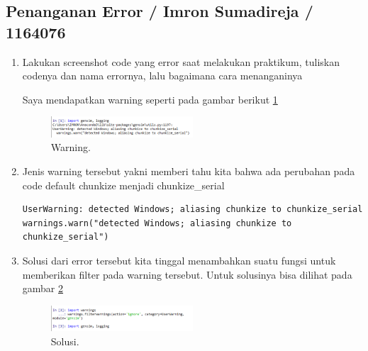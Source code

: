 \subsection{Penanganan Error / Imron Sumadireja / 1164076}
\begin{enumerate}

\item Lakukan screenshot code yang error saat melakukan praktikum, tuliskan codenya dan nama errornya, lalu bagaimana cara menanganinya \par

Saya mendapatkan warning seperti pada gambar berikut \ref{simW}	
		\begin{figure}[!htbp]
		\centerline{\includegraphics[width=0.5\textwidth]{figures/im/simWarning.png}}
		\caption{Warning.}
		\label{simW}
		\end{figure}
	
\item Jenis warning tersebut yakni memberi tahu kita bahwa ada perubahan pada code default chunkize menjadi chunkize\_serial
		
\begin{verbatim}
UserWarning: detected Windows; aliasing chunkize to chunkize_serial warnings.warn("detected Windows; aliasing chunkize to chunkize_serial")
\end{verbatim}

\item Solusi dari error tersebut kita tinggal menambahkan suatu fungsi untuk memberikan filter pada warning tersebut. Untuk solusinya bisa dilihat pada gambar \ref{simSol}
		\begin{figure}[!htbp]
		\centerline{\includegraphics[width=0.5\textwidth]{figures/im/simSolusi.png}}
		\caption{Solusi.}
		\label{simSol}
		\end{figure}

\end{enumerate}